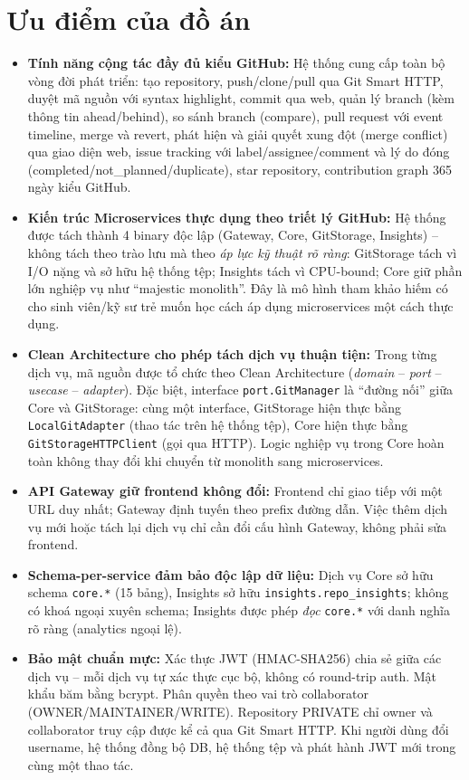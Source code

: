 \section{Ưu điểm của đồ án}
\begin{itemize}
\item \textbf{Tính năng cộng tác đầy đủ kiểu GitHub:} Hệ thống cung cấp toàn bộ vòng đời phát triển: tạo repository, push/clone/pull qua Git Smart HTTP, duyệt mã nguồn với syntax highlight, commit qua web, quản lý branch (kèm thông tin ahead/behind), so sánh branch (compare), pull request với event timeline, merge và revert, phát hiện và giải quyết xung đột (merge conflict) qua giao diện web, issue tracking với label/assignee/comment và lý do đóng (completed/not\_planned/duplicate), star repository, contribution graph 365 ngày kiểu GitHub.
\item \textbf{Kiến trúc Microservices thực dụng theo triết lý GitHub:} Hệ thống được tách thành 4 binary độc lập (Gateway, Core, GitStorage, Insights) -- không tách theo trào lưu mà theo \textit{áp lực kỹ thuật rõ ràng}: GitStorage tách vì I/O nặng và sở hữu hệ thống tệp; Insights tách vì CPU-bound; Core giữ phần lớn nghiệp vụ như ``majestic monolith''. Đây là mô hình tham khảo hiếm có cho sinh viên/kỹ sư trẻ muốn học cách áp dụng microservices một cách thực dụng.
\item \textbf{Clean Architecture cho phép tách dịch vụ thuận tiện:} Trong từng dịch vụ, mã nguồn được tổ chức theo Clean Architecture (\textit{domain} -- \textit{port} -- \textit{usecase} -- \textit{adapter}). Đặc biệt, interface \texttt{port.GitManager} là ``đường nối'' giữa Core và GitStorage: cùng một interface, GitStorage hiện thực bằng \texttt{LocalGitAdapter} (thao tác trên hệ thống tệp), Core hiện thực bằng \texttt{GitStorageHTTPClient} (gọi qua HTTP). Logic nghiệp vụ trong Core hoàn toàn không thay đổi khi chuyển từ monolith sang microservices.
\item \textbf{API Gateway giữ frontend không đổi:} Frontend chỉ giao tiếp với một URL duy nhất; Gateway định tuyến theo prefix đường dẫn. Việc thêm dịch vụ mới hoặc tách lại dịch vụ chỉ cần đổi cấu hình Gateway, không phải sửa frontend.
\item \textbf{Schema-per-service đảm bảo độc lập dữ liệu:} Dịch vụ Core sở hữu schema \texttt{core.*} (15 bảng), Insights sở hữu \texttt{insights.repo\_insights}; không có khoá ngoại xuyên schema; Insights được phép \textit{đọc} \texttt{core.*} với danh nghĩa rõ ràng (analytics ngoại lệ).
\item \textbf{Bảo mật chuẩn mực:} Xác thực JWT (HMAC-SHA256) chia sẻ giữa các dịch vụ -- mỗi dịch vụ tự xác thực cục bộ, không có round-trip auth. Mật khẩu băm bằng bcrypt. Phân quyền theo vai trò collaborator (OWNER/MAINTAINER/WRITE). Repository PRIVATE chỉ owner và collaborator truy cập được kể cả qua Git Smart HTTP. Khi người dùng đổi username, hệ thống đồng bộ DB, hệ thống tệp và phát hành JWT mới trong cùng một thao tác.

\end{itemize}
